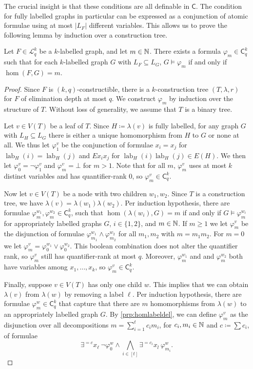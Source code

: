 \documentclass{lmcs}
\theoremstyle{plain}\newtheorem{claim}[thm]{Claim}   %
\newcommand{\NN}{\ensuremath \mathbb{N}}
\newcommand{\cL}{\ensuremath{\mathcal L}}
\newcommand{\Lkq}{\ensuremath{\cL_{q}^{k}}}
\newcommand{\lC} {\ensuremath{\mathsf C}}
\newcommand{\elimOrd}[2]{$(#1,#2)$-constructible}
\newcommand{\elimDepth}{elimination depth}
\DeclareMathOperator{\labfkt}{lab}
\renewcommand\phi\varphi
\begin{document}
The crucial insight is that these conditions are all definable in $\lC$.
The condition for fully labelled graphs in particular can be expressed as a conjunction of atomic formulae using at most $|L_F|$ different variables.
This allows us to prove the following lemma by induction over a construction tree.

\begin{lem}
	\label{lem:homcounts_in_ckq}
	Let $F \in \Lkq$ be a $k$-labelled graph, and let $m\in \NN$.
	There exists a formula $\phi_m \in \lC^k_q$ such that for each $k$-labelled graph $G$ with $L_F \subseteq L_G$, $G \models \phi_m$ if and only if $\hom(F, G) = m$.
\end{lem}

\begin{proof}
	Since $F$ is \elimOrd{k}{q}, there is a $k$-construction tree $(T, \lambda, r)$ for $F$ of \elimDepth{} at most $q$.
	We construct $\phi_m$ by induction over the structure of $T$.
	Without loss of generality, we assume that $T$ is a binary tree.
	
	Let $v \in V(T)$ be a leaf of $T$.
	Since $H \coloneqq \lambda(v)$ is fully labelled, for any graph $G$ with $L_{H} \subseteq L_G$ there is either a unique homomorphism from $H$ to
	$G$ or none at all.
	We thus let $\phi_1^v$ be the conjunction of formulae $x_i = x_j$ for $\labfkt_{H}(i) = \labfkt_{H}(j)$ and $Ex_ix_j$ for $\labfkt_{H}(i)\labfkt_{H}(j) \in E(H)$.
	We then let $\phi^v_0 = \neg \phi^v_1$ and $\phi^v_m = \bot$ for $m > 1$.
	Note that for all $m$, $\phi^v_m$ uses at most $k$ distinct variables and has quantifier-rank $0$, so $\phi_m^v \in \lC^k_q$.
	
	Now let $v \in V(T)$ be a node with two children $w_1, w_2$.
	Since $T$ is a construction tree, we have $\lambda(v) = \lambda(w_1)\lambda(w_2)$.
	Per induction hypothesis, there are formulae $\phi^{w_1}_m, \phi^{w_2}_m \in \lC^k_q$, such that $\hom(\lambda(w_i), G) = m$ if and only if $G \models \phi^{w_i}_m$ for appropriately labelled graphs $G$, $i \in \{1,2\}$, and $m \in \NN$.
	If $m \geq 1$ we let $\phi^v_m$ be the disjunction of formulae $\phi^{w_1}_{m_1} \land \phi^{w_2}_{m_2}$ for all $m_1, m_2$ with $m = m_1m_2$.
	For $m = 0$ we let $\phi_m^v = \phi^{w_1}_0 \lor \phi^{w_2}_0$.
	This boolean combination does not alter the quantifier rank, so $\phi^v_m$ still has quantifier-rank at most $q$.
	Moreover, $\phi^{w_1}_m$ and and $\phi^{w_2}_m$ both have variables among $x_1, \dots, x_k$, so $\phi^v_m \in \lC^k_q$.
	
	Finally, suppose $v \in V(T)$ has only one child $w$.
	This implies that we can obtain $\lambda(v)$ from $\lambda(w)$ by removing a label $\ell$.
	Per induction hypothesis, there are formulae $\phi^w_m \in \lC^k_q$ that capture that there are $m$ homomorphisms from $\lambda(w)$ to an appropriately labelled graph $G$.
	By \autoref{prp:homlabeldel}, we can define $\phi^v_m$ as the disjunction over all decompositions $m = \sum_{i=1}^t c_im_i$, for $c_i, m_i \in \NN$ and $c \coloneqq \sum c_i$, of formulae
	\begin{equation*}
		\exists^{= c} x_\ell ~\neg\phi^w_0 \land \bigwedge_{i \in [t]} \exists^{=c_i}x_l ~\phi^w_{m_i}.
	\end{equation*}
	

\end{proof}
\end{document}

